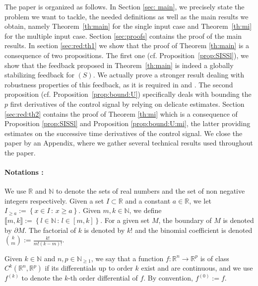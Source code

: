 \documentclass[letterpaper, 10pt]{article}
\newcommand{\reels}{\mathbb{R}}
\newcommand{\entiers}{\mathbb{N}}
\begin{document}
The paper is organized as follows. In Section \ref{sec: main}, we precisely state the problem we want to tackle, the needed definitions as well as the main results we obtain, namely Theorem~\ref{th:main} for the single input case and Theorem~\ref{th:mi} for the multiple input case. Section \ref{sec:proofs} contains the proof of the main results. In section \ref{sec:red:th1} we show that the proof of Theorem \ref{th:main} is a consequence of two propositions. The first one (cf. Proposition~\ref{prop:SISSl}), we show that the feedback proposed in Theorem~\ref{th:main} is indeed a globally stabilizing feedback for $(S)$. We actually prove a stronger result dealing with robustness properties of this feedback, as it is required in \cite{Teel92} and \cite{SSY}. The second proposition (cf. Proposition~\ref{prop:bound:U}) specifically deals with bounding the $p$ first derivatives of the control signal by relying on delicate estimates. Section \ref{sec:red:th2} contains the proof of Theorem \ref{th:mi} which is a consequence of Proposition \ref{prop:SISSl} and Proposition \ref{prop:bound:U:mi}, the latter providing estimates on the successive time derivatives of the control signal. We close the paper by an Appendix, where we gather several technical results used throughout the paper.



\paragraph{Notations :} We use $\reels$ and $\mathbb N$ to denote the sets of real numbers and the set of non negative integers respectively. Given a set $I\subset \mathbb R$ and a constant $a\in\mathbb R$, we let $I_{\geq a}:=\left\{x\in I\,:\, x\geq a\right\}$. Given $m, k \in \entiers$, we define $\llbracket m , k \rrbracket:=\left\{l\in\mathbb N\,:\, l\in[m,k]\right\}$. For a given set $M$,  the boundary of $M$ is denoted by $\partial M$. The factorial of $k$ is denoted by $k!$ and the binomial coefficient is denoted  $\binom{k}{ m}:=\frac{k!}{m! (k-m)!}$.

Given $k\in\mathbb N$ and $n,p\in\mathbb N_{\geq 1}$, we say that a function $f : \reels^n \rightarrow \reels^p$ is of class $C^{k}(\reels^n , \reels^p)$ if its differentials up to order $k$ exist and are continuous, and we use $f^{(k)}$ to denote the $k$-th order differential of $f$. By convention, $f^{(0)}:=f$. 
\end{document}
